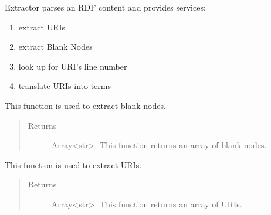 \documentclass[letterpaper,10pt,english]{sphinxmanual}
\begin{document}
\begin{fulllineitems}
\label{api_ref:extractor.Extractor}
Extractor parses an RDF content and provides services:
\begin{enumerate}
\item {} 
extract URIs

\item {} 
extract Blank Nodes

\item {} 
look up for URI's line number

\item {} 
translate URIs into terms

\end{enumerate}

\begin{fulllineitems}
\label{api_ref:extractor.Extractor.getBnodes}
This function is used to extract blank nodes.
\begin{quote}\begin{description}
\item[{Returns}] \leavevmode
Array\textless{}str\textgreater{}. This function returns an array of blank nodes.

\end{description}\end{quote}

\end{fulllineitems}


\begin{fulllineitems}
\label{api_ref:extractor.Extractor.getUris}
This function is used to extract URIs.
\begin{quote}\begin{description}
\item[{Returns}] \leavevmode
Array\textless{}str\textgreater{}. This function returns an array of URIs.

\end{description}\end{quote}

\end{fulllineitems}



\end{fulllineitems}
\end{document}
